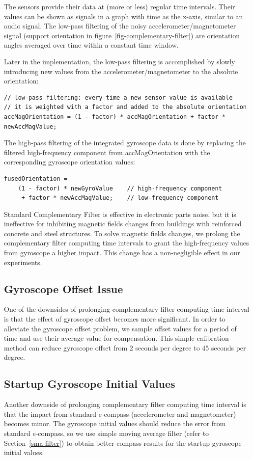 The sensors provide their data at (more or less) regular time intervals. Their values can be shown as signals in a graph with time as the x-axis, similar to an audio signal. The low-pass filtering of the noisy accelerometer/magnetometer signal (support orientation in figure~\ref{fig-complementary-filter}) are orientation angles averaged over time within a constant time window.

Later in the implementation, the low-pass filtering is accomplished by slowly introducing new values from the accelerometer/magnetometer to the absolute orientation:
\begin{verbatim}
// low-pass filtering: every time a new sensor value is available
// it is weighted with a factor and added to the absolute orientation
accMagOrientation = (1 - factor) * accMagOrientation + factor * newAccMagValue;
\end{verbatim}
The high-pass filtering of the integrated gyroscope data is done by replacing the filtered high-frequency component from accMagOrientation with the corresponding gyroscope orientation values:
\begin{verbatim}
fusedOrientation =
    (1 - factor) * newGyroValue    // high-frequency component
     + factor * newAccMagValue;    // low-frequency component
\end{verbatim}

Standard Complementary Filter is effective in electronic parts noise, but it is ineffective for inhibiting magnetic fields changes from buildings with reinforced concrete and steel structures. To solve magnetic fields changes, we prolong the complementary filter computing time intervals to grant the high-frequency values from gyroscope a higher impact. This change has a non-negligible effect in our experiments.

\subsection{Gyroscope Offset Issue}
One of the downsides of prolonging complementary filter computing time interval is that the effect of gyroscope offset becomes more significant. In order to alleviate the gyroscope offset problem, we sample offset values for a period of time and use their average value for compensation. This simple calibration method can reduce gyroscope offset from 2 seconds per degree to 45 seconds per degree.

\subsection{Startup Gyroscope Initial Values}
Another downside of prolonging complementary filter computing time interval is that the impact from standard e-compass (accelerometer and magnetometer) becomes minor. The gyroscope initial values should reduce the error from standard e-compass, so we use simple moving average filter (refer to Section~\ref{sma-filter}) to obtain better compass results for the startup gyroscope initial values. 
